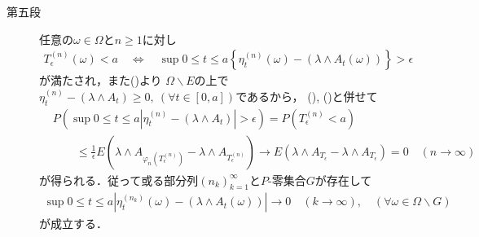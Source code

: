 \begin{prf}
\begin{description}
			\item[第五段]
				任意の$\omega \in \Omega$と$n \geq 1$に対し
				\begin{align}
					T^{(n)}_\epsilon(\omega) < a
					\quad \Longleftrightarrow \quad
					\sup{0 \leq t \leq a}{\left\{\eta^{(n)}_t(\omega) - (\lambda \wedge A_t(\omega))\right\}} > \epsilon
				\end{align}
				が満たされ，また()より
				$\Omega \backslash E$の上で$\eta^{(n)}_t-(\lambda \wedge A_t) \geq 0,\ (\forall t \in [0,a])$であるから，
				(), ()と併せて
				\begin{align}
					&P\left(\sup{0 \leq t \leq a}{\left|\eta^{(n)}_t-(\lambda \wedge A_t)\right|} > \epsilon\right)
					= P\left(T^{(n)}_\epsilon < a\right) \\
					&\qquad \leq \frac{1}{\epsilon} E\left(\lambda \wedge A_{\varphi_n\left(T^{(n)}_\epsilon\right)}
						- \lambda \wedge A_{T^{(n)}_\epsilon} \right)
					\longrightarrow E\left(\lambda \wedge A_{T_\epsilon}
						- \lambda \wedge A_{T_\epsilon} \right) = 0 \quad (n \longrightarrow \infty)
				\end{align}
				が得られる．従って或る部分列$(n_k)_{k=1}^\infty$と$P$-零集合$G$が存在して
				\begin{align}
					\sup{0 \leq t \leq a}{\left|\eta^{(n_k)}_t(\omega)-(\lambda \wedge A_t(\omega))\right|}
					\longrightarrow 0
					\quad (k \longrightarrow \infty),
					\quad (\forall \omega \in \Omega \backslash G)
					\label{eq:chapter_1_theorem_4_14_6}
				\end{align}
				が成立する．
				

\end{description}
\end{prf}
